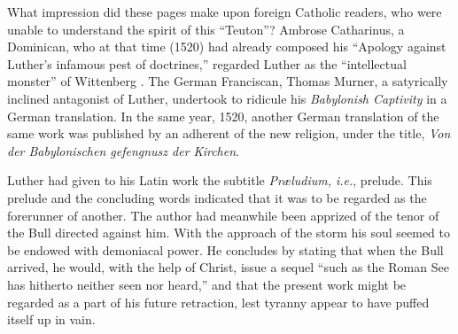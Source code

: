 What impression did these pages make upon foreign Catholic
readers, who were unable to understand the spirit of this “Teuton”?
Ambrose Catharinus, a Dominican, who at that time (1520) had
already composed his “Apology against Luther’s infamous pest of
doctrines,” regarded Luther as the “intellectual monster” of Wittenberg
. The German Franciscan, Thomas Murner, a satyrically inclined
antagonist of Luther, undertook to ridicule his \textit{Babylonish Captivity}
in a German translation. In the same year, 1520, another German
translation of the same work was published by an adherent of the
new religion, under the title, \textit{Von der Babylonischen gefengnusz der
Kirchen}.

Luther had given to his Latin work the subtitle \textit{Præludium, i.e.},
prelude. This prelude and the concluding words indicated that it was
to be regarded as the forerunner of another. The author had meanwhile been
apprized of the tenor of the Bull directed against him.
With the approach of the storm his soul seemed to be endowed with
demoniacal power. He concludes by stating that when the Bull arrived, he
would, with the help of Christ, issue a sequel “such as the
Roman See has hitherto neither seen nor heard,” and that the present
work might be regarded as a part of his future retraction, lest tyranny
appear to have puffed itself up in vain.

